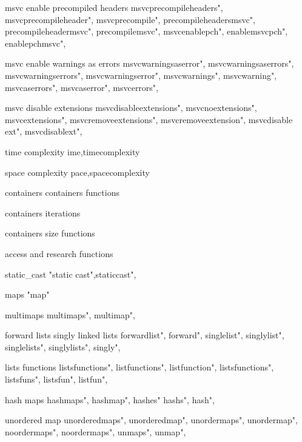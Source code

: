          msvc enable precompiled headers 
        msvcprecompileheaders",  
        msvcprecompileheader",  
        msvcprecompile",  
        precompileheadersmsvc",  
        precompileheadermsvc",  
        precompilemsvc",  
        msvcenablepch",  
        enablemsvcpch",  
        enablepchmsvc",  
        
         msvc enable warnings as errors
        msvcwarningsaserror", 
        msvcwarningsaserrors", 
        msvcwarningserrors", 
        msvcwarningserror", 
        msvcwarnings", 
        msvcwarning", 
        msvcaserrors", 
        msvcaserror", 
        msvcerrors", 
        
         msvc disable extensions 
        msvcdisableextensions", 
        msvcnoextensions", 
        msvcextensions", 
        msvcremoveextensions", 
        msvcremoveextension", 
        msvcdisable ext", 
        msvcdisablext", 

         time complexity
        ime,timecomplexity
        
         space complexity
        pace,spacecomplexity
        
         containers
         containers functions
        
         containers iterations
        
         containers size functions 
        
         access and research functions 
        
         static_cast 
         "static cast",staticcast",
        
         maps
         "map"
        
         multimaps
        multimaps", 
        multimap",
        
         forward lists singly linked lists
        forwardlist",  
        forward",  
        singlelist",  
        singlylist",  
        singlelists",  
        singlylists",  
        singly",  
        
         lists functions 
        listsfunctions",  
        listfunctions",  
        listfunction",  
        listsfunctions",  
        listsfuns",  
        listsfun",  
        listfun",  
         
         hash maps 
        hashmaps", 
        hashmap",
        hashes"
        hashs",
        hash",
        
         unordered map 
        unorderedmaps", 
        unorderedmap", 
        unordermaps", 
        unordermap", 
        noordermaps", 
        noordermaps", 
        unmaps", 
        unmap", 
         
